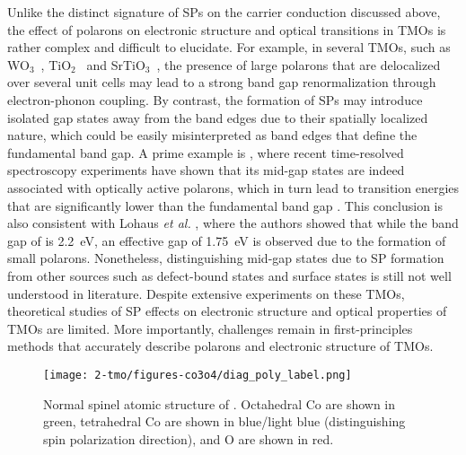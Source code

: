 Unlike the distinct signature of SPs on the carrier conduction discussed above, the effect of polarons on electronic structure and optical transitions in TMOs is rather complex and difficult to elucidate. For example, in several TMOs, such as WO$_3$~\cite{gerosa2018role,ping2013}, TiO$_2$~\cite{TiO22018,Moser2013,Kang2010} and SrTiO$_3$~\cite{verdi2017origin,Wang2016}, the presence of large polarons that are delocalized over several unit cells may lead to a strong band gap renormalization through electron-phonon coupling. By contrast, the formation of SPs may introduce isolated gap states away from the band edges due to their spatially localized nature, which could be easily misinterpreted as band edges that define the fundamental band gap. A prime example is , where recent time-resolved spectroscopy experiments have shown that its mid-gap states are indeed associated with optically active polarons, which in turn lead to transition energies that are significantly lower than the fundamental band gap \cite{carneiro2017excitation,biswas2018ultrafast}. This conclusion is also consistent with Lohaus \textit{et al.} \cite{lohaus2018limitation}, where the authors showed that while the band gap of  is 2.2~eV, an effective gap of 1.75~eV is observed due to the formation of small polarons. Nonetheless, distinguishing mid-gap states due to SP formation from other sources such as defect-bound states \cite{huda2010electronic,neufeld2015platinum,sanson2015polaronic} and surface states \cite{yatom2015toward} is still not well understood in literature. Despite extensive experiments on these TMOs, theoretical studies of SP effects on electronic structure and optical properties of TMOs are limited. More importantly, challenges remain in first-principles methods that accurately describe polarons and electronic structure of TMOs.

\begin{figure}[t]
\begin{center}
\texttt{[image: 2-tmo/figures-co3o4/diag\_poly\_label.png]}
\caption{Normal spinel atomic structure of \co. Octahedral Co are shown in green, tetrahedral Co are shown in blue/light blue (distinguishing spin polarization direction), and O are shown in red.}  \label{co3o4:fig:struct}
\end{center}
\end{figure}

